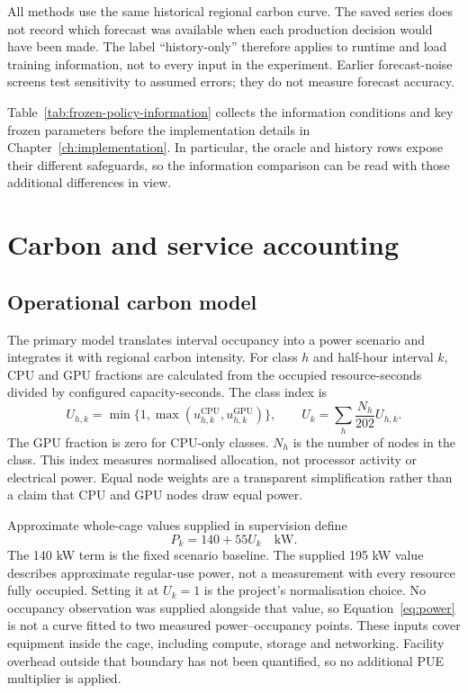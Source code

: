 All methods use the same historical regional carbon curve. The saved series does not record which forecast was available when each production decision would have been made. The label ``history-only'' therefore applies to runtime and load training information, not to every input in the experiment. Earlier forecast-noise screens test sensitivity to assumed errors; they do not measure forecast accuracy.

Table~\ref{tab:frozen-policy-information} collects the information conditions and key frozen parameters before the implementation details in Chapter~\ref{ch:implementation}. In particular, the oracle and history rows expose their different safeguards, so the information comparison can be read with those additional differences in view.

\FloatBarrier


\section{Carbon and service accounting}
\subsection{Operational carbon model}
The primary model translates interval occupancy into a power scenario and integrates it with regional carbon intensity. For class $h$ and half-hour interval $k$, CPU and GPU fractions are calculated from the occupied resource-seconds divided by configured capacity-seconds. The class index is
\begin{equation}
U_{h,k}=\min\{1,\max(u^{\mathrm{CPU}}_{h,k},u^{\mathrm{GPU}}_{h,k})\},\qquad
U_k=\sum_h\frac{N_h}{202}U_{h,k}.
\end{equation}
The GPU fraction is zero for CPU-only classes. $N_h$ is the number of nodes in the class. This index measures normalised allocation, not processor activity or electrical power. Equal node weights are a transparent simplification rather than a claim that CPU and GPU nodes draw equal power.

Approximate whole-cage values supplied in supervision define
\begin{equation}\label{eq:power}
P_k=140+55U_k\quad\mathrm{kW}.
\end{equation}
The 140 kW term is the fixed scenario baseline. The supplied 195 kW value describes approximate regular-use power, not a measurement with every resource fully occupied. Setting it at $U_k=1$ is the project's normalisation choice. No occupancy observation was supplied alongside that value, so Equation~\ref{eq:power} is not a curve fitted to two measured power--occupancy points. These inputs cover equipment inside the cage, including compute, storage and networking. Facility overhead outside that boundary has not been quantified, so no additional PUE multiplier is applied.

